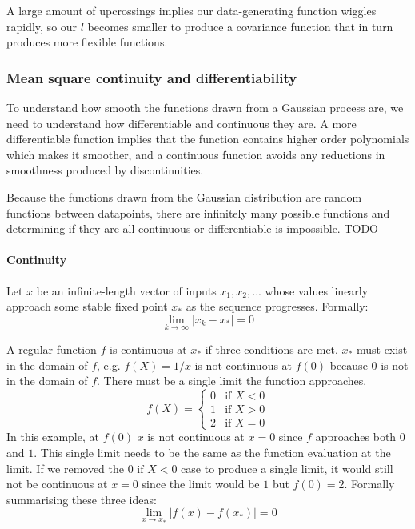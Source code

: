 A large amount of upcrossings implies our data-generating function wiggles rapidly, so our $l$ becomes smaller to produce a covariance function that in turn produces more flexible functions.

\subsubsection{Mean square continuity and differentiability}
To understand how smooth the functions drawn from a Gaussian process are, we need to understand how differentiable and continuous they are. A more differentiable function implies that the function contains higher order polynomials which makes it smoother, and a continuous function avoids any reductions in smoothness produced by discontinuities.

Because the functions drawn from the Gaussian distribution are random functions between datapoints, there are infinitely many possible functions and determining if they are all continuous or differentiable is impossible. TODO 



\paragraph{Continuity}
Let $x$ be an infinite-length vector of inputs $x_1, x_2, ...$ whose values linearly approach some stable fixed point $x_*$ as the sequence progresses. Formally:
\begin{equation*}
    \lim_{k \to \infty} |x_k - x_*| = 0
\end{equation*}

A regular function $f$ is continuous at $x_*$ if three conditions are met. $x_*$ must exist in the domain of $f$, e.g. $f(X) = 1/x$ is not continuous at $f(0)$ because $0$ is not in the domain of $f$. There must be a single limit the function approaches.
\begin{equation*}
    f(X) = \begin{cases}
        0 & \text{if } X < 0 \\
        1 & \text{if } X > 0 \\
        2 & \text{if } X = 0
    \end{cases}
\end{equation*}
In this example, at $f(0)$ $x$ is not continuous at $x = 0$ since $f$ approaches both $0$ and $1$. This single limit needs to be the same as the function evaluation at the limit. If we removed the $0 \text{ if } X < 0$ case to produce a single limit, it would still not be continuous at $x = 0$ since the limit would be $1$ but $f(0) = 2$. Formally summarising these three ideas:
\begin{equation*}
    \lim_{x \to x_*} |f(x) - f(x_*)| = 0
\end{equation*}


